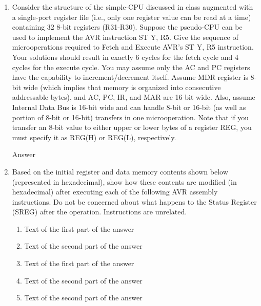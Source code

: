 \documentclass[12pt,letterpaper]{article}
\begin{document}
\begin{enumerate}
    \item
    Consider the structure of the simple-CPU discussed in class augmented with a
    single-port register file (i.e., only one register value can be read at a time)
    containing 32 8-bit registers (R31-R30). Suppose the pseudo-CPU can be used to
    implement the AVR instruction ST Y, R5. Give the sequence of microoperations
    required to Fetch and Execute AVR’s ST Y, R5 instruction. Your solutions should
    result in exactly 6 cycles for the fetch cycle and 4 cycles for the execute
    cycle. You may assume only the AC and PC registers have the capability to
    increment/decrement itself. Assume MDR register is 8-bit wide (which implies
    that memory is organized into consecutive addressable bytes), and AC, PC, IR,
    and MAR are 16-bit wide. Also, assume Internal Data Bus is 16-bit wide and can
    handle 8-bit or 16-bit (as well as portion of 8-bit or 16-bit) transfers in one
    microoperation.  Note that if you transfer an 8-bit value to either upper or
    lower bytes of a register REG, you must specify it as REG(H) or REG(L),
    respectively.


    Answer

    \item
    Based on the initial register and data memory contents shown below
    (represented in hexadecimal), show how these contents are modified (in
    hexadecimal) after executing each of the following AVR assembly instructions.
    Do not be concerned about what happens to the Status Register (SREG) after the
    operation. Instructions are unrelated.

    \begin{enumerate}
        \item
        Text of the first part of the answer

        \item
        Text of the second part of the answer

        \item
        Text of the first part of the answer

        \item
        Text of the second part of the answer

        \item
        Text of the second part of the answer
    \end{enumerate}

\end{enumerate}
\end{document}
